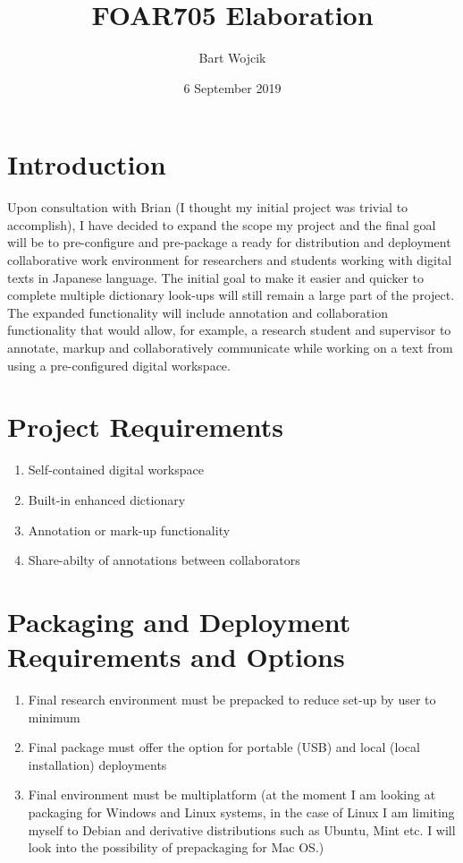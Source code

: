 \documentclass{article}
\title{FOAR705 Elaboration}
\author{Bart Wojcik}
\date{6 September 2019}
\begin{document}
\maketitle

\section{Introduction}
Upon consultation with Brian (I thought my initial project was trivial to accomplish), I have decided to expand the scope my project and the final goal will be to pre-configure and pre-package a ready for distribution and deployment collaborative work environment for researchers and students working with digital texts in Japanese language. The initial goal to make it easier and quicker to complete multiple dictionary look-ups will still remain a large part of the project. The expanded functionality will include annotation and collaboration functionality that would allow, for example, a research student and supervisor to annotate, markup and collaboratively communicate while working on a text from using a pre-configured digital workspace.

\section{Project Requirements}
\begin{enumerate}
    \item Self-contained digital workspace
    \item Built-in enhanced dictionary
    \item Annotation or mark-up functionality
    \item Share-abilty of annotations between collaborators
\end{enumerate}
\section{Packaging and Deployment Requirements and Options}
\begin{enumerate}
    \item Final research environment must be prepacked to reduce set-up by user to minimum
    \item Final package must offer the option for portable (USB) and local (local installation) deployments
    \item Final environment must be multiplatform (at the moment I am looking at packaging for Windows and Linux systems, in the case of Linux I am limiting myself to Debian and derivative distributions such as Ubuntu, Mint etc. I will look into the possibility of prepackaging for Mac OS.)
\end{enumerate}
\end{document}
